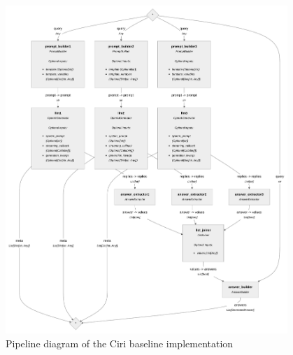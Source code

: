 \begin{figure}[h]
    \centering
    \includegraphics[width=0.95\textwidth]{images/baseline_ciri.pdf}
    \caption{Pipeline diagram of the Ciri baseline implementation}
    \label{fig:pipeline_ciri}
\end{figure}






